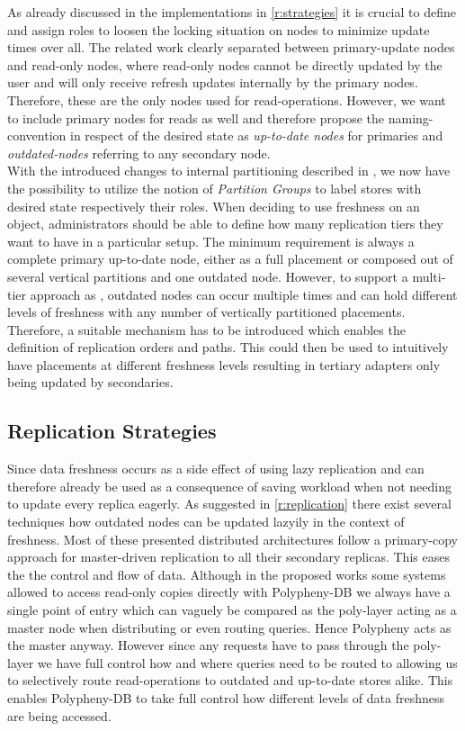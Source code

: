 As already discussed in the implementations in \ref{r:strategies} it is crucial to define and assign roles to loosen the locking situation on nodes
to minimize update times over all. The related work clearly separated between primary-update nodes and read-only nodes, where 
read-only nodes cannot be directly updated by the user and will only receive refresh updates internally by the primary nodes.
Therefore, these are the only nodes used for read-operations. 
However, we want to include primary nodes for reads as well and therefore propose the naming-convention in respect of the desired state as \emph{up-to-date nodes} for primaries
and \emph{outdated-nodes} referring to any secondary node. \\
With the introduced changes to internal partitioning described in \cite{hennemann_2021}, we now have the possibility to utilize the notion of \emph{Partition Groups}
to label stores with desired state respectively their roles.  
When deciding to use freshness on an object, administrators should be able to define how many replication tiers they want to have in a particular setup.
The minimum requirement is always a complete primary up-to-date node, either as a full placement or composed out of several vertical partitions and one outdated node.  
However, to support a multi-tier approach as \cite{voicu:2010}, outdated nodes can occur multiple times and can hold different levels of freshness with any number of vertically partitioned
placements. Therefore, a suitable mechanism has to be introduced which enables the definition of replication orders and paths. This could then be used to 
intuitively have placements at different freshness levels resulting in tertiary adapters only being updated by secondaries.\\




\subsection{Replication Strategies}
\label{sec:replication_strategy}
Since data freshness occurs as a side effect of using lazy replication and can therefore already
be used as a consequence of saving workload when not needing to update every replica eagerly.
As suggested in \ref{r:replication} there exist several techniques how outdated nodes can be updated lazyily in the context of freshness.
Most of these presented distributed architectures follow a primary-copy approach for master-driven replication to all their secondary replicas.
This eases the the control and flow of data. Although in the proposed works some systems allowed to access read-only copies directly
with Polypheny-DB we always have a single point of entry which can vaguely be compared as the poly-layer acting as a master node
when distributing or even routing queries. Hence Polypheny acts as the master anyway. However since any requests have to pass through the poly-layer
we have full control how and where queries need to be routed to allowing us to selectively route read-operations to outdated and up-to-date stores alike.
This enables Polypheny-DB to take full control how different levels of data freshness are being accessed.

